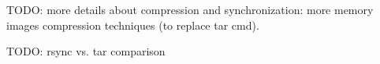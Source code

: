 


TODO: more details about compression and synchronization: more memory images compression techniques (to replace tar cmd). 

TODO: rsync vs. tar comparison

